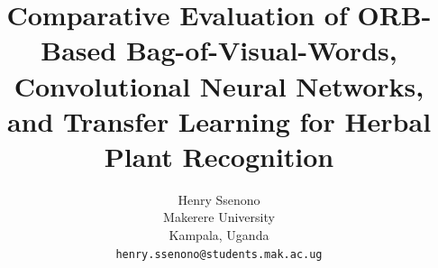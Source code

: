 \documentclass[10pt,twocolumn,letterpaper]{article}
\title{Comparative Evaluation of ORB-Based Bag-of-Visual-Words, Convolutional Neural Networks, and Transfer Learning for Herbal Plant Recognition
}
\author{Henry Ssenono\\
Makerere University\\
Kampala, Uganda\\
{\tt\small henry.ssenono@students.mak.ac.ug}
}
\begin{document}
\maketitle
    





{
    \small
    
    
}
\end{document}
